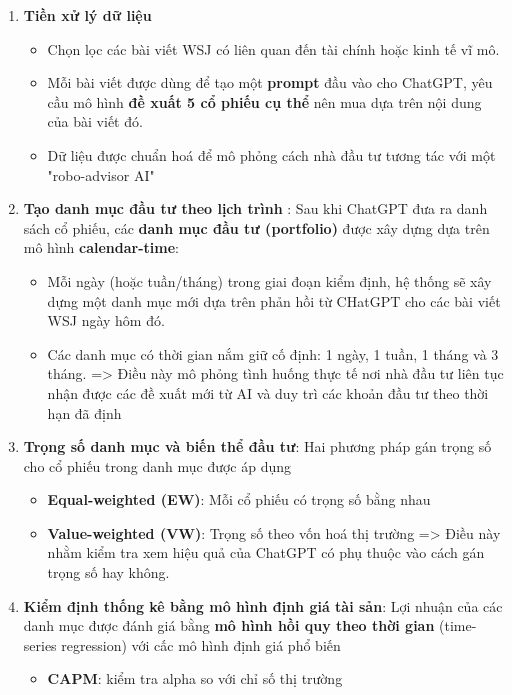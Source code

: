 \documentclass[a4paper,12pt]{article}
\begin{document}
\begin{enumerate}
    \item \textbf{Tiền xử lý dữ liệu}\begin{itemize}
        \item Chọn lọc các bài viết WSJ có liên quan đến tài chính hoặc kinh tế vĩ mô.
        \item Mỗi bài viết được dùng để tạo một \textbf{prompt} đầu vào cho ChatGPT, yêu cầu mô hình \textbf{đề xuất 5 cổ phiếu cụ thể} nên mua dựa trên nội dung của bài viết đó.
        \item Dữ liệu được chuẩn hoá để mô phỏng cách nhà đầu tư tương tác với một "robo-advisor AI"
    \end{itemize}
    \item \textbf{Tạo danh mục đầu tư theo lịch trình} : Sau khi ChatGPT đưa ra danh sách cổ phiếu, các \textbf{danh mục đầu tư (portfolio)} được xây dựng dựa trên mô hình \textbf{calendar-time}:\begin{itemize}
        \item Mỗi ngày (hoặc tuần/tháng) trong giai đoạn kiểm định, hệ thống sẽ xây dựng một danh mục mới dựa trên phản hồi từ CHatGPT cho các bài viết WSJ ngày hôm đó.
        \item Các danh mục có thời gian nắm giữ cố định: 1 ngày, 1 tuần, 1 tháng và 3 tháng.
        => Điều này mô phỏng tình huống thực tế nơi nhà đầu tư liên tục nhận được các đề xuất mới từ AI và duy trì các khoản đầu tư theo thời hạn đã định
    \end{itemize}
    \item \textbf{Trọng số danh mục và biến thể đầu tư}: Hai phương pháp gán trọng số cho cổ phiếu trong danh mục được áp dụng \begin{itemize}
        \item \textbf{Equal-weighted (EW)}: Mỗi cổ phiếu có trọng số bằng nhau
        \item  \textbf{Value-weighted (VW)}: Trọng số theo vốn hoá thị trường
        => Điều này nhằm kiểm tra xem hiệu quả của ChatGPT có phụ thuộc vào cách gán trọng số hay không.
    \end{itemize}
    \item \textbf{Kiểm định thống kê bằng mô hình định giá tài sản}: Lợi nhuận của các danh mục được đánh giá bằng \textbf{mô hình hồi quy theo thời gian} (time-series regression) với cấc mô hình định giá phổ biến \begin{itemize}
        \item \textbf{CAPM}: kiểm tra alpha so với chỉ số thị trường

\end{itemize}
\end{enumerate}
\end{document}
